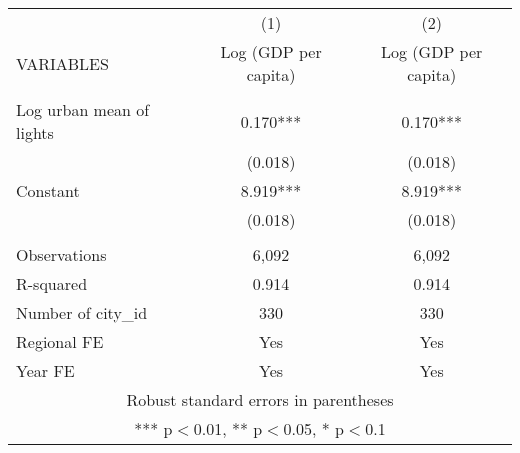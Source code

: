 \documentclass[]{article}
\begin{document}
\begin{tabular}{lcc} \hline
 & (1) & (2) \\
VARIABLES & Log (GDP per capita) & Log (GDP per capita) \\ \hline
 &  &  \\
Log urban mean of lights & 0.170*** & 0.170*** \\
 & (0.018) & (0.018) \\
Constant & 8.919*** & 8.919*** \\
 & (0.018) & (0.018) \\
 &  &  \\
Observations & 6,092 & 6,092 \\
R-squared & 0.914 & 0.914 \\
Number of city\_id & 330 & 330 \\
Regional FE & Yes & Yes \\
 Year FE & Yes & Yes \\ \hline
\multicolumn{3}{c}{ Robust standard errors in parentheses} \\
\multicolumn{3}{c}{ *** p$<$0.01, ** p$<$0.05, * p$<$0.1} \\
\end{tabular}
\end{document}
